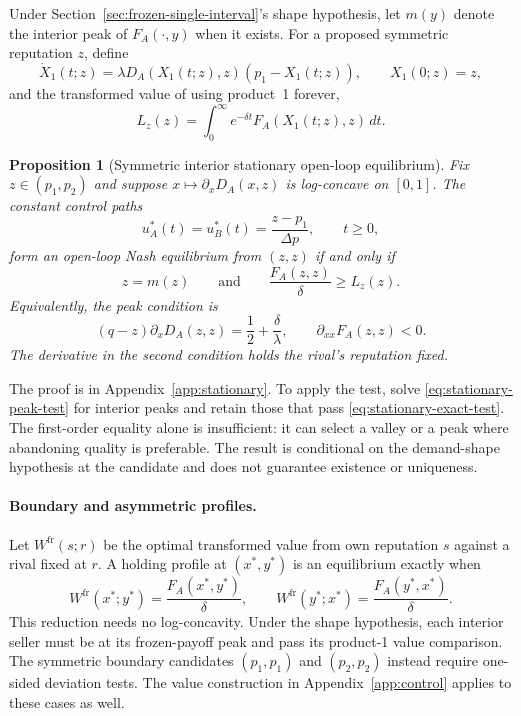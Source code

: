 \documentclass[11pt]{article}
\newtheorem{proposition}{Proposition}
\theoremstyle{definition}
\begin{document}
Under Section~\ref{sec:frozen-single-interval}'s shape hypothesis, let
$m(y)$ denote the interior peak of $F_A(\cdot,y)$ when it exists.
For a proposed symmetric reputation $z$, define
\begin{equation*}
\dot X_1(t;z)=\lambda D_A(X_1(t;z),z)(p_1-X_1(t;z)),
\qquad X_1(0;z)=z,
\end{equation*}
and the transformed value of using product~1 forever,
\begin{equation}\label{eq:stationary-low-value}
L_z(z)=\int_0^\infty e^{-\delta t}F_A(X_1(t;z),z)\,dt.
\end{equation}

\begin{proposition}[Symmetric interior stationary open-loop equilibrium]
\label{prop:stationary-open-loop}
Fix $z\in(p_1,p_2)$ and suppose $x\mapsto\partial_xD_A(x,z)$ is
log-concave on $[0,1]$. The constant control paths
\begin{equation*}
u_A^*(t)=u_B^*(t)=\frac{z-p_1}{\Delta p},\qquad t\geq0,
\end{equation*}
form an open-loop Nash equilibrium from $(z,z)$ if and only if
\begin{equation}\label{eq:stationary-exact-test}
z=m(z)
\qquad\text{and}\qquad
\frac{F_A(z,z)}{\delta}\geq L_z(z).
\end{equation}
Equivalently, the peak condition is
\begin{equation}\label{eq:stationary-peak-test}
(q-z)\partial_xD_A(z,z)=\frac12+\frac{\delta}{\lambda},
\qquad \partial_{xx}F_A(z,z)<0.
\end{equation}
The derivative in the second condition holds the rival's reputation fixed.
\end{proposition}

The proof is in Appendix~\ref{app:stationary}. To apply the test, solve
\eqref{eq:stationary-peak-test} for interior peaks and retain those that
pass \eqref{eq:stationary-exact-test}. The first-order equality alone is
insufficient: it can select a valley or a peak where abandoning quality
is preferable. The result is conditional on the demand-shape hypothesis
at the candidate and does not guarantee existence or uniqueness.

\paragraph{Boundary and asymmetric profiles.}
Let $W^{\mathrm{fr}}(s;r)$ be the optimal transformed value from own
reputation $s$ against a rival fixed at $r$. A holding profile at
$(x^*,y^*)$ is an equilibrium exactly when
\begin{equation}\label{eq:general-stationary-test}
W^{\mathrm{fr}}(x^*;y^*)=\frac{F_A(x^*,y^*)}{\delta},
\qquad
W^{\mathrm{fr}}(y^*;x^*)=\frac{F_A(y^*,x^*)}{\delta}.
\end{equation}
This reduction needs no log-concavity. Under the shape hypothesis, each
interior seller must be at its frozen-payoff peak and pass its product-1
value comparison. The symmetric boundary candidates $(p_1,p_1)$ and
$(p_2,p_2)$ instead require one-sided deviation tests. The value construction
in Appendix~\ref{app:control} applies to these cases as well.
\end{document}
